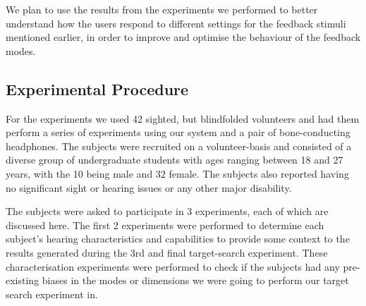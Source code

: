 \documentclass[format=sigconf, review=true, screen=true, anonymous=true]{acmart}
\begin{document}
We plan to use the results from the experiments we performed to better understand how the users respond to different settings for the feedback stimuli mentioned earlier, in order to improve and optimise the behaviour of the feedback modes.




\subsection{Experimental Procedure}

For the experiments we used 42 sighted, but blindfolded volunteers and had them perform a series of experiments using our system and a pair of bone-conducting headphones. The subjects were recruited on a volunteer-basis and consisted of a diverse group of undergraduate students with ages ranging between 18 and 27 years, with the 10 being male and 32 female. The subjects also reported having no significant sight or hearing issues or any other major disability. 

The subjects were asked to participate in 3 experiments, each of which are discussed here. The first 2 experiments were performed to determine each subject's hearing characteristics and capabilities to provide some context to the results generated during the 3rd and final target-search experiment. These characterisation experiments were performed to check if the subjects had any pre-existing biases in the modes or dimensions we were going to perform our target search experiment in. 
\end{document}
